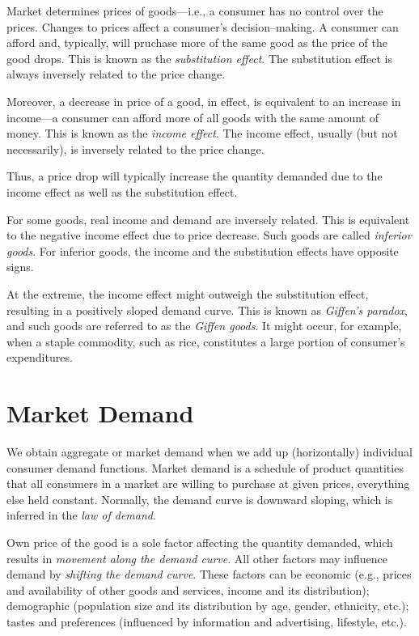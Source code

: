 \documentclass[
]{book}
\begin{document}
Market determines prices of goods---i.e., a consumer has no control over the prices. Changes to prices affect a consumer's decision--making. A consumer can afford and, typically, will pruchase more of the same good as the price of the good drops. This is known as the \emph{substitution effect}. The substitution effect is always inversely related to the price change.

Moreover, a decrease in price of a good, in effect, is equivalent to an increase in income---a consumer can afford more of all goods with the same amount of money. This is known as the \emph{income effect}. The income effect, usually (but not necessarily), is inversely related to the price change.

Thus, a price drop will typically increase the quantity demanded due to the income effect as well as the substitution effect.

For some goods, real income and demand are inversely related. This is equivalent to the negative income effect due to price decrease. Such goods are called \emph{inferior goods}. For inferior goods, the income and the substitution effects have opposite signs.

At the extreme, the income effect might outweigh the substitution effect, resulting in a positively sloped demand curve. This is known as \emph{Giffen's paradox}, and such goods are referred to as the \emph{Giffen goods}. It might occur, for example, when a staple commodity, such as rice, constitutes a large portion of consumer's expenditures.

\hypertarget{market-demand}{%
\section{Market Demand}\label{market-demand}}

We obtain aggregate or market demand when we add up (horizontally) individual consumer demand functions. Market demand is a schedule of product quantities that all consumers in a market are willing to purchase at given prices, everything else held constant. Normally, the demand curve is downward sloping, which is inferred in the \emph{law of demand}.

Own price of the good is a sole factor affecting the quantity demanded, which results in \emph{movement along the demand curve}. All other factors may influence demand by \emph{shifting the demand curve}. These factors can be economic (e.g., prices and availability of other goods and services, income and its distribution); demographic (population size and its distribution by age, gender, ethnicity, etc.); tastes and preferences (influenced by information and advertising, lifestyle, etc.).
\end{document}
